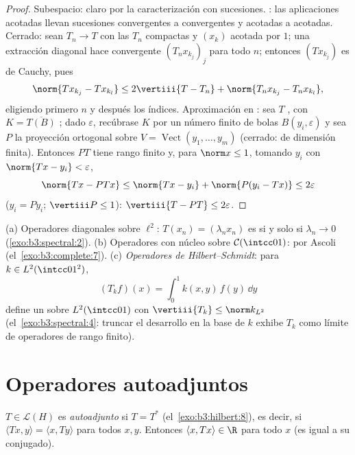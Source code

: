 \begin{proof}
Subespacio: claro por la caracterización con sucesiones.
: las aplicaciones acotadas llevan
sucesiones convergentes a convergentes y acotadas a acotadas. Cerrado:
sean $T_n \to T$ con las $T_n$
compactas y $(x_k)$ acotada por $1$;
una extracción diagonal hace convergente $(T_nx_{k_j})_j$ para todo $n$;
entonces $(Tx_{k_j})$ es de Cauchy, pues
\[
\norm{Tx_{k_j} - Tx_{k_l}} \leq 2\vertiii{T - T_n} +
\norm{T_nx_{k_j} - T_nx_{k_l}} ,
\]
eligiendo primero $n$ y después los índices. Aproximación en
: sea $T$
, con $K = \overline{T(B)}$
; dado $\varepsilon$,
recúbrase $K$ por un número finito de bolas $B(y_i, \varepsilon)$ y sea
$P$ la proyección ortogonal sobre
$V = \operatorname{Vect}(y_1, \dots, y_m)$ (cerrado: de dimensión
finita). Entonces $PT$ tiene rango finito y, para $\norm x \leq 1$,
tomando $y_i$ con $\norm{Tx - y_i} <
\varepsilon$,
\[
\norm{Tx - PTx} \leq \norm{Tx - y_i} + \norm{P(y_i - Tx)}
\leq 2\varepsilon
\]
($y_i = Py_i$; $\vertiii P \leq 1$): $\vertiii{T - PT} \leq
2\varepsilon$.
\end{proof}

\begin{example}\label{ex:b3:spectral:examples}
(a) Operadores diagonales sobre $\ell^2$: $T(x_n) = (\lambda_nx_n)$ es
 si y solo si
$\lambda_n \to 0$
(\cref{exo:b3:spectral:2}).
(b) Operadores con núcleo sobre $\mathcal C(\intcc01)$:
 por Ascoli
(el~\cref{exo:b3:complete:7}). (c) \emph{Operadores de
Hilbert--Schmidt}: para
$k \in L^2(\intcc01^2)$,
\[
(T_kf)(x) = \int_0^1k(x, y)\,f(y)\,\dd y
\]
define un  sobre
$L^2(\intcc01)$ con
$\vertiii{T_k} \leq \norm k_{L^2}$
(el~\cref{exo:b3:spectral:4}: truncar el desarrollo en la base de $k$
exhibe $T_k$ como límite de operadores de rango finito).
\end{example}

\section{Operadores autoadjuntos}

\begin{definition}\label{def:b3:spectral:selfadjoint}
$T \in \mathcal L(H)$ es \emph{autoadjunto}
si $T = T^*$ (el~\cref{exo:b3:hilbert:8}), es decir, si
$\langle Tx, y\rangle = \langle x, Ty\rangle$ para todos $x, y$.
Entonces $\langle x, Tx\rangle \in \R$ para todo $x$ (es igual a su
conjugado).
\end{definition}

